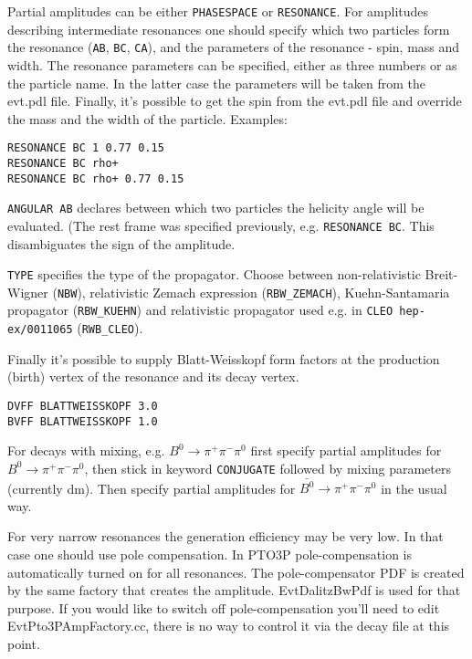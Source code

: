 Partial amplitudes can be either \texttt{PHASESPACE} or \texttt{RESONANCE}.
For amplitudes describing intermediate resonances one should specify which 
two particles form the resonance (\texttt{AB}, \texttt{BC}, \texttt{CA}),
and the parameters of the resonance - spin, mass and width. The resonance parameters 
can be specified, either as three numbers or as the particle name. In the latter case
the parameters will be taken from the evt.pdl file. Finally, it's possible to 
get the spin from the evt.pdl file and override the mass and the width of the particle.
Examples:

\begin{verbatim}
RESONANCE BC 1 0.77 0.15
RESONANCE BC rho+
RESONANCE BC rho+ 0.77 0.15
\end{verbatim}
    
\texttt{ANGULAR AB} declares between which two particles the helicity angle will be evaluated.
(The rest frame was specified previously, e.g. \texttt{RESONANCE BC}. This disambiguates
the sign of the amplitude.

\texttt{TYPE} specifies the type of the propagator. Choose between non-relativistic
Breit-Wigner (\texttt{NBW}), relativistic Zemach expression (\texttt{RBW\_ZEMACH}),
Kuehn-Santamaria propagator (\texttt{RBW\_KUEHN}) and relativistic propagator 
used e.g. in \texttt{CLEO hep-ex/0011065} (\texttt{RWB\_CLEO}). 

Finally it's possible to supply Blatt-Weisskopf form factors at the 
production (birth) vertex of the resonance and its decay vertex.

\begin{verbatim}
DVFF BLATTWEISSKOPF 3.0
BVFF BLATTWEISSKOPF 1.0
\end{verbatim} 




For decays with mixing, e.g. $B^0 \to \pi^+ \pi^- \pi^0$ first 
specify partial amplitudes for $B^0 \to \pi^+ \pi^- \pi^0$,
then stick in keyword \texttt{CONJUGATE} followed by mixing 
parameters (currently dm). Then specify partial amplitudes for
$\bar{B^0}   \to \pi^+ \pi^- \pi^0$ in the usual way.


For very narrow resonances the generation efficiency may be very low. 
In that case one should use pole compensation. In PTO3P pole-compensation is 
automatically turned on for all resonances. The pole-compensator PDF is created by 
the same factory that creates the amplitude. EvtDalitzBwPdf is used for that purpose.
If you would like to switch off pole-compensation you'll need to edit EvtPto3PAmpFactory.cc,
there is no way to control it via the decay file at this point.

